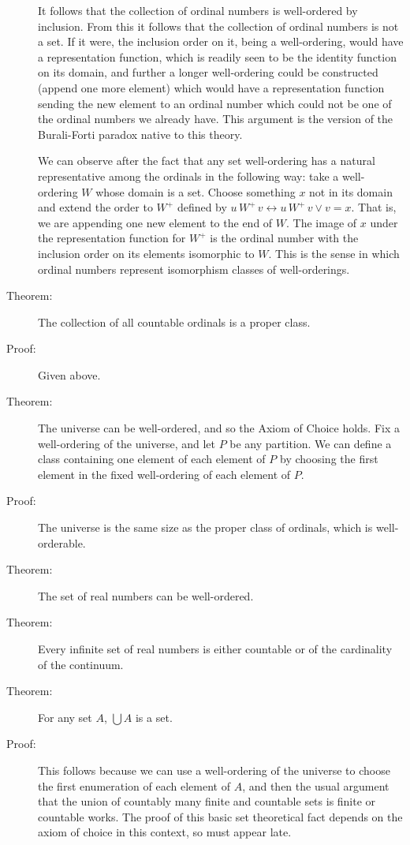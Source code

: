 \documentclass[12pt]{article}
\begin{document}
\begin{description}
It follows that the collection of ordinal numbers is well-ordered by inclusion.  From this it follows that the collection of ordinal numbers is not a set.  If it were, the inclusion order on it, being a well-ordering, would have a representation function, which is readily seen to be the identity function on its domain, and further a longer well-ordering could be constructed
(append one more element) which would have a representation function sending the new element to an ordinal number which could not be one of the ordinal numbers we already have.  This argument is the version of the Burali-Forti paradox native to this theory.

We can observe after the fact that any set well-ordering has a natural representative among the ordinals  in the following way:  take a well-ordering $W$ whose domain is a set.  Choose something $x$ not in its domain and extend the order to $W^+$  defined by $u \, W^+ \, v \leftrightarrow u \, W^+ \, v \vee v=x$.  That is, we are appending one new element to the end of $W$.
The image of $x$ under the representation function for $W^+$ is the ordinal number with the  inclusion order on its elements  isomorphic to $W$.  This is the sense in which ordinal numbers represent isomorphism classes of well-orderings.


\item[Theorem:]  The collection of all countable ordinals is a proper class.

\item[Proof:] Given above.

\item[Theorem:]  The universe can be well-ordered, and so the Axiom of Choice holds.  Fix a well-ordering of the universe, and let $P$ be any partition.  We can define a class containing one element of each element of $P$ by choosing the first element in the fixed well-ordering of each element of $P$.

\item[Proof:]  The universe is the same size as the proper class of ordinals, which is well-orderable.

\item[Theorem:]  The set of real numbers can be well-ordered.

\item[Theorem:]  Every infinite set of real numbers is either countable or of the cardinality of the continuum.

\item[Theorem:]  For any set $A$, $\bigcup A$ is a set.

\item[Proof:]  This follows because we can use a well-ordering of the universe to choose the first enumeration of each element of $A$, and then the usual argument
that the union of countably many finite and countable sets is finite or countable works.  The proof of this basic set theoretical fact depends on the axiom of choice in this context, so must appear late.

\end{description}
\end{document}
